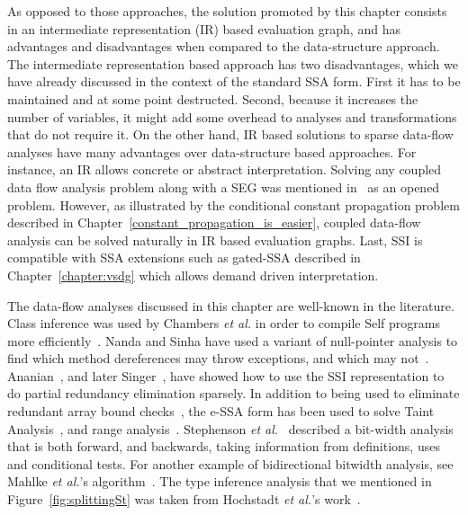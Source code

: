 As opposed to those approaches, the solution promoted by this chapter consists in an intermediate representation (IR) based evaluation graph, and has advantages and disadvantages when compared to the data-structure approach.
The intermediate representation based approach has two disadvantages, which we have already discussed in the context of the standard SSA form.
First it has to be maintained and at some point destructed.
Second, because it increases the number of variables, it might add some overhead to analyses and transformations that do not require it.
On the other hand, IR based solutions to sparse data-flow analyses have many advantages over data-structure based approaches.
For instance, an IR allows concrete or abstract interpretation.
Solving any coupled data flow analysis problem along with a SEG was mentioned in~\cite{Choi91} as an opened problem.
However, as illustrated by the conditional constant propagation problem described in Chapter~\ref{constant_propagation_is_easier}, coupled data-flow analysis can be solved naturally in IR based evaluation graphs.
Last, SSI is compatible with SSA extensions such as gated-SSA described in Chapter~\ref{chapter:vsdg} which allows demand driven interpretation.

The data-flow analyses discussed in this chapter are well-known in the literature.
Class inference was used by Chambers {\em et al.} in order to compile Self programs more efficiently~\cite{Chambers89}.
Nanda and Sinha have used a variant of null-pointer analysis to find which method dereferences may throw exceptions, and which may not~\cite{Nanda09}.
Ananian~\cite{Ananian99}, and later Singer~\cite{Singer06}, have showed how to use the SSI representation to do partial redundancy elimination sparsely.
In addition to being used to eliminate redundant array bound checks~\cite{Bodik00}, the e-SSA form has been used to solve Taint Analysis~\cite{Rimsa11}, and range analysis~\cite{Su05,Gawlitza09}.
Stephenson {\em et al.}~\cite{Stephenson00} described a bit-width analysis that is both forward, and backwards, taking information from definitions, uses and conditional tests.
For another example of bidirectional bitwidth analysis, see Mahlke {\em et al.}'s algorithm~\cite{Mahlke01}.
The type inference analysis that we mentioned in Figure~\ref{fig:splittingSt} was taken from Hochstadt {\em et al.}'s work~\cite{Hochstadt08}.

